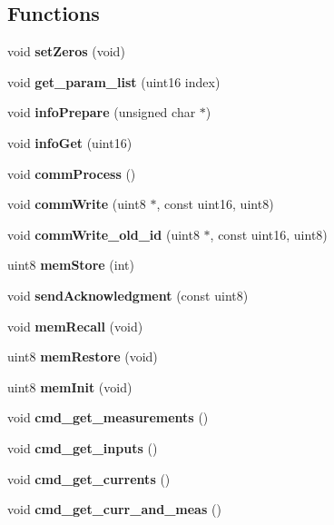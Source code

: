 \subsection*{Functions}
\begin{DoxyCompactItemize}
\item 
\mbox{\label{command__processing_8h_abb781ac00e0752ce772a75f7b5d1a5b7}} 
void {\bfseries set\+Zeros} (void)
\item 
\mbox{\label{command__processing_8h_a5ef086c932682ca5f7549b74ead732aa}} 
void {\bfseries get\+\_\+param\+\_\+list} (uint16 index)
\item 
\mbox{\label{command__processing_8h_a6fda7bc0be24d261f9cb09e77616b1be}} 
void {\bfseries info\+Prepare} (unsigned char $\ast$)
\item 
\mbox{\label{command__processing_8h_a813734e69ea461791f84bddee422013f}} 
void {\bfseries info\+Get} (uint16)
\item 
\mbox{\label{command__processing_8h_a2e5d1711e19837adc3e8f479af3ae509}} 
void {\bfseries comm\+Process} ()
\item 
\mbox{\label{command__processing_8h_af59b7a35df04af1df698749a771890eb}} 
void {\bfseries comm\+Write} (uint8 $\ast$, const uint16, uint8)
\item 
\mbox{\label{command__processing_8h_af454a3663070706183ebf8f1ba784343}} 
void {\bfseries comm\+Write\+\_\+old\+\_\+id} (uint8 $\ast$, const uint16, uint8)
\item 
uint8 \textbf{ mem\+Store} (int)
\item 
\mbox{\label{command__processing_8h_afe5c87f9df9bb965976b5d40c4159f1f}} 
void {\bfseries send\+Acknowledgment} (const uint8)
\item 
void \textbf{ mem\+Recall} (void)
\item 
uint8 \textbf{ mem\+Restore} (void)
\item 
uint8 \textbf{ mem\+Init} (void)
\item 
void \textbf{ cmd\+\_\+get\+\_\+measurements} ()
\item 
\mbox{\label{command__processing_8h_a20db4694e8caa572ec479f73ce8b3b02}} 
void {\bfseries cmd\+\_\+get\+\_\+inputs} ()
\item 
\mbox{\label{command__processing_8h_aaf613e251c1e14fe4fffe3e9e033f9f7}} 
void {\bfseries cmd\+\_\+get\+\_\+currents} ()
\item 
\mbox{\label{command__processing_8h_a45a90a8455bfdb6a7f0e118da2c6f0a6}} 
void {\bfseries cmd\+\_\+get\+\_\+curr\+\_\+and\+\_\+meas} ()
\item 

\end{DoxyCompactItemize}
